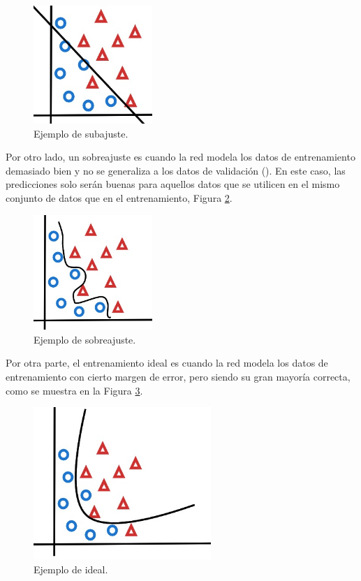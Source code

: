 \begin{figure}[H]
    \centering
    \includegraphics[width=0.4\textwidth]{MarcoTeorico/imgs/Ajuste_subajuste.jpg}
    \caption{Ejemplo de subajuste.}
    \label{fig:OverFiting}
\end{figure}


Por otro lado, un sobreajuste es cuando la red modela los datos de entrenamiento demasiado bien y no se generaliza a los datos de validación (\cite{rosebrock2017deep}). En este caso, las predicciones solo serán buenas para aquellos datos que se utilicen en el mismo conjunto de datos que en el entrenamiento, Figura \ref{fig:underFiting}.

\begin{figure}[H]
    \centering
    \includegraphics[width=0.4\textwidth]{MarcoTeorico/imgs/Ajuste_sobreajuste.jpg}
    \caption{Ejemplo de sobreajuste.}
    \label{fig:underFiting}
\end{figure}

Por otra parte, el entrenamiento ideal es cuando la red modela los datos de entrenamiento con cierto margen de error, pero siendo su gran mayoría correcta, como se muestra en la Figura \ref{fig:idealFiting}.

\begin{figure}[H]
    \centering
    \includegraphics[width=0.6\textwidth]{MarcoTeorico/imgs/Ajuste_ideal.jpg}
    \caption{Ejemplo de ideal.}
    \label{fig:idealFiting}
\end{figure}

